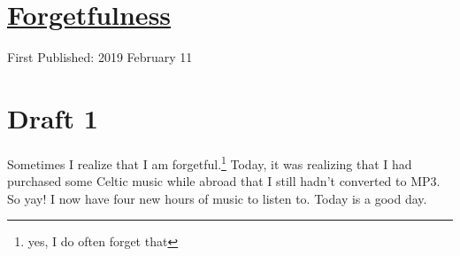 \documentclass[12pt]{article}[titlepage]
\newcommand{\1}{\={a}}
\newcommand{\2}{\={e}}
\newcommand{\3}{\={\i}}
\newcommand{\4}{\=o}
\newcommand{\5}{\=u}
\newcommand{\6}{\={A}}
\renewcommand{\,}{\textsuperscript{,}}
\begin{document}
\doublespacing
\section{\href{forgetfulness.html}{Forgetfulness}}
First Published: 2019 February 11
\section{Draft 1}
Sometimes I realize that I am forgetful.\footnote{yes, I do often forget that}
Today, it was realizing that I had purchased some Celtic music while abroad that I still hadn't converted to MP3.
So yay!
I now have four new hours of music to listen to.
Today is a good day.
\end{document}

